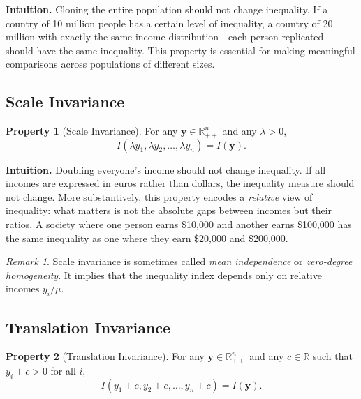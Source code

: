 \documentclass[12pt]{article}
\theoremstyle{plain}
\theoremstyle{definition}
\newtheorem{axiom}{Property}
\theoremstyle{remark}
\newtheorem{remark}[theorem]{Remark}
\newcommand{\R}{\mathbb{R}}
\newcommand{\bfy}{\mathbf{y}}
\begin{document}
\textbf{Intuition.}
Cloning the entire population should not change inequality.
If a country of 10 million people has a certain level of inequality, a country of 20 million with exactly the same income distribution---each person replicated---should have the same inequality.
This property is essential for making meaningful comparisons across populations of different sizes.

\subsection{Scale Invariance}\label{sec:scaleinv}

\begin{axiom}[Scale Invariance]\label{ax:scale}
For any $\bfy \in \R_{++}^n$ and any $\lambda > 0$,
\begin{equation}
I(\lambda y_1, \lambda y_2, \ldots, \lambda y_n) = I(\bfy).
\end{equation}
\end{axiom}

\textbf{Intuition.}
Doubling everyone's income should not change inequality.
If all incomes are expressed in euros rather than dollars, the inequality measure should not change.
More substantively, this property encodes a \emph{relative} view of inequality: what matters is not the absolute gaps between incomes but their ratios.
A society where one person earns \$10{,}000 and another earns \$100{,}000 has the same inequality as one where they earn \$20{,}000 and \$200{,}000.

\begin{remark}
Scale invariance is sometimes called \emph{mean independence} or \emph{zero-degree homogeneity}.
It implies that the inequality index depends only on relative incomes $y_i/\mu$.
\end{remark}

\subsection{Translation Invariance}\label{sec:transinv}

\begin{axiom}[Translation Invariance]\label{ax:trans}
For any $\bfy \in \R_{++}^n$ and any $c \in \R$ such that $y_i + c > 0$ for all $i$,
\begin{equation}
I(y_1 + c, y_2 + c, \ldots, y_n + c) = I(\bfy).
\end{equation}
\end{axiom}
\end{document}
